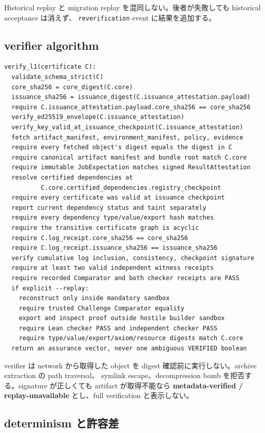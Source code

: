 \documentclass[a4paper,11pt]{ltjsarticle}
\newcommand{\term}[1]{\textbf{\color{TFNavy}#1}}
\newcommand{\code}[1]{\texttt{#1}}
\begin{document}
Historical replay と migration replay を混同しない。後者が失敗しても historical acceptance は消えず、
\code{reverification} event に結果を追加する。

\subsection{verifier algorithm}

\begin{lstlisting}[language={},basicstyle=\ttfamily\scriptsize]
verify_l1(certificate C):
  validate_schema_strict(C)
  core_sha256 = core_digest(C.core)
  issuance_sha256 = issuance_digest(C.issuance_attestation.payload)
  require C.issuance_attestation.payload.core_sha256 == core_sha256
  verify_ed25519_envelope(C.issuance_attestation)
  verify_key_valid_at_issuance_checkpoint(C.issuance_attestation)
  fetch artifact_manifest, environment_manifest, policy, evidence
  require every fetched object's digest equals the digest in C
  require canonical artifact manifest and bundle root match C.core
  require immutable JobExpectation matches signed ResultAttestation
  resolve certified dependencies at
          C.core.certified_dependencies.registry_checkpoint
  require every certificate was valid at issuance checkpoint
  report current dependency status and taint separately
  require every dependency type/value/export hash matches
  require the transitive certificate graph is acyclic
  require C.log_receipt.core_sha256 == core_sha256
  require C.log_receipt.issuance_sha256 == issuance_sha256
  verify cumulative log inclusion, consistency, checkpoint signature
  require at least two valid independent witness receipts
  require recorded Comparator and both checker receipts are PASS
  if explicit --replay:
    reconstruct only inside mandatory sandbox
    require trusted Challenge Comparator equality
    export and inspect proof outside hostile builder sandbox
    require Lean checker PASS and independent checker PASS
    require type/value/export/axiom/resource digests match C.core
  return an assurance vector, never one ambiguous VERIFIED boolean
\end{lstlisting}

verifier は network から取得した object を digest 確認前に実行しない。archive extraction の path traversal、
symlink escape、decompression bomb を拒否する。signature が正しくても artifact が取得不能なら
\term{metadata-verified / replay-unavailable} とし、full verification と表示しない。

\subsection{determinism と許容差}
\end{document}
